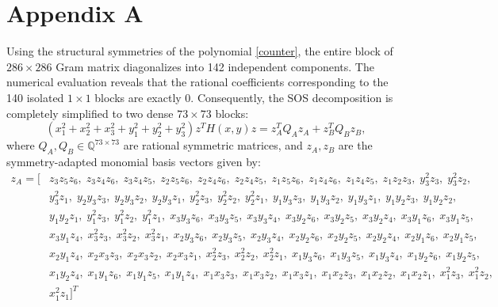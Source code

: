 \documentclass[12pt]{elsarticle}
\theoremstyle{definition}
\begin{document}
\newpage
\section*{Appendix A}\label{Appendix:A}

Using the structural symmetries \cite{parrilo2005exploiting, gatermann2004symmetry} of the polynomial \eqref{counter}, the entire block of $286 \times 286$ Gram matrix diagonalizes into 142 independent components. The numerical evaluation reveals that the rational coefficients corresponding to the 140 isolated $1 \times 1$ blocks are exactly 0. Consequently, the SOS decomposition is completely simplified to two dense $73 \times 73$ blocks:
\begin{equation}
(x_1^2+x_2^2 +x_3^2 + y_1^2+y_2^2 + y_3^2)z^TH(x,y)z = z_A^T Q_A z_A + z_B^T Q_B z_B,
\end{equation}
where $Q_A, Q_B \in \mathbb{Q}^{73 \times 73}$ are rational symmetric matrices, and $z_A, z_B$ are the symmetry-adapted monomial basis vectors given by:
\begin{align*}
z_A = [& z_3 z_5 z_6,\; z_3 z_4 z_6,\; z_3 z_4 z_5,\; z_2 z_5 z_6,\; z_2 z_4 z_6,\; z_2 z_4 z_5,\; z_1 z_5 z_6,\; z_1 z_4 z_6,\; z_1 z_4 z_5,\; z_1 z_2 z_3,\; y_3^2 z_3,\; y_3^2 z_2,\\
& y_3^2 z_1,\; y_2 y_3 z_3,\; y_2 y_3 z_2,\; y_2 y_3 z_1,\; y_2^2 z_3,\; y_2^2 z_2,\; y_2^2 z_1,\; y_1 y_3 z_3,\; y_1 y_3 z_2,\; y_1 y_3 z_1,\; y_1 y_2 z_3,\; y_1 y_2 z_2,\\
& y_1 y_2 z_1,\; y_1^2 z_3,\; y_1^2 z_2,\; y_1^2 z_1,\; x_3 y_3 z_6,\; x_3 y_3 z_5,\; x_3 y_3 z_4,\; x_3 y_2 z_6,\; x_3 y_2 z_5,\; x_3 y_2 z_4,\; x_3 y_1 z_6,\; x_3 y_1 z_5,\\
& x_3 y_1 z_4,\; x_3^2 z_3,\; x_3^2 z_2,\; x_3^2 z_1,\; x_2 y_3 z_6,\; x_2 y_3 z_5,\; x_2 y_3 z_4,\; x_2 y_2 z_6,\; x_2 y_2 z_5,\; x_2 y_2 z_4,\; x_2 y_1 z_6,\; x_2 y_1 z_5,\\
& x_2 y_1 z_4,\; x_2 x_3 z_3,\; x_2 x_3 z_2,\; x_2 x_3 z_1,\; x_2^2 z_3,\; x_2^2 z_2,\; x_2^2 z_1,\; x_1 y_3 z_6,\; x_1 y_3 z_5,\; x_1 y_3 z_4,\; x_1 y_2 z_6,\; x_1 y_2 z_5,\\
& x_1 y_2 z_4,\; x_1 y_1 z_6,\; x_1 y_1 z_5,\; x_1 y_1 z_4,\; x_1 x_3 z_3,\; x_1 x_3 z_2,\; x_1 x_3 z_1,\; x_1 x_2 z_3,\; x_1 x_2 z_2,\; x_1 x_2 z_1,\; x_1^2 z_3,\; x_1^2 z_2,\\
&  x_1^2 z_1]^T
\end{align*}
\end{document}

